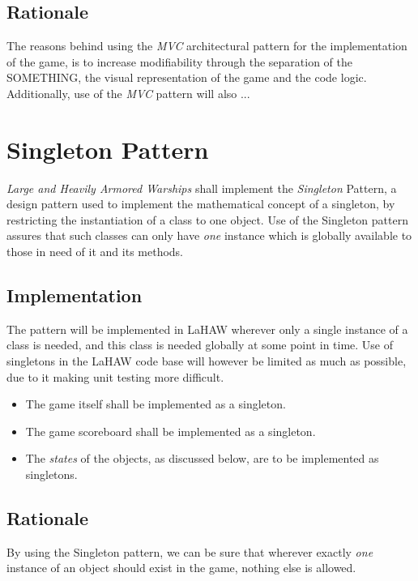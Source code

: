     \subsection{Rationale}
    The reasons behind using the \emph{MVC} architectural pattern for the implementation of the game, is to increase modifiability through the separation of the SOMETHING, the visual representation of the game and the code logic. Additionally, use of the \emph{MVC} pattern will also ...


    \section{Singleton Pattern}
    \emph{Large and Heavily Armored Warships} shall implement the \emph{Singleton} Pattern, a design pattern used to implement the mathematical concept of a singleton, by restricting the instantiation of a class to one object\cite{singleton}.
    Use of the Singleton pattern assures that such classes can only have \emph{one} instance which is globally available to those in need of it and its methods.
    
    \subsection{Implementation}
    The pattern will be implemented in LaHAW wherever only a single instance of a class is needed, and this class is needed globally at some point in time. Use of singletons in the LaHAW code base will however be limited as much as possible, due to it making unit testing more difficult\cite{singleton_unit_testing}.
    
    \begin{itemize}
        \item The game itself shall be implemented as a singleton.
        \item The game scoreboard shall be implemented as a singleton.
        \item The \emph{states} of the objects, as discussed below, are to be implemented as singletons.
    
    \end{itemize}
    
    \subsection{Rationale}
    By using the Singleton pattern, we can be sure that wherever exactly \emph{one} instance of an object should exist in the game, nothing else is allowed.
    

